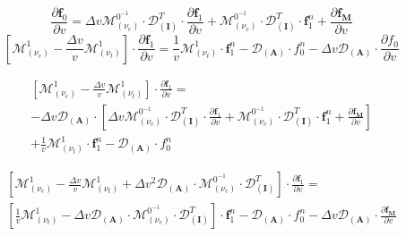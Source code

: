 \documentclass[preprint,12pt]{elsarticle}
\newcommand{\pdv}[2]{\frac{\partial{#1}}{\partial{#2}}}
\newcommand{\vect}[1]{\boldsymbol{#1}}
\newcommand{\matr}[1]{\mathbf{#1}}
\newcommand{\nue}{\nu_{e}}
\newcommand{\nutot}{\nu_{t}}
\newcommand{\vmag}{v}
\newcommand{\fM}{f_M}
\newcommand{\fzero}{f_0}
\newcommand{\vfzero}{\vect{f}_0}
\newcommand{\fone}{\vect{f}_1}
\newcommand{\MI}{\matr{I}}
\newcommand{\MA}{\matr{A}}
\newcommand{\IM}{\boldsymbol{\mathcal{M}}}
\newcommand{\ID}{\boldsymbol{\mathcal{D}}}
\begin{document}
\begin{equation}
  \pdv{\vfzero}{\vmag}  
  = 
  \Delta \vmag \IM^{0^{-1}}_{(\nue)}\cdot\ID^T_{\left(\MI\right)} \cdot 
  \pdv{\fone}{\vmag}
  + \IM^{0^{-1}}_{(\nue)}\cdot\ID^T_{\left(\MI\right)} \cdot \fone^n
  + \pdv{\vect{\fM}}{\vmag}
  \label{eq:implicitdf0dv}
\end{equation}
\begin{equation}
  \left[\IM^1_{(\nue)} 
  - \frac{\Delta \vmag}{\vmag}\IM^1_{\left( \nutot \right)} \right]
  \cdot \pdv{\fone}{\vmag}  
  = 
  \frac{1}{\vmag}\IM^1_{\left( \nutot \right)} 
  \cdot \fone^n
  - \ID_{\left(\MA\right)}\cdot \fzero^n
  - \Delta \vmag \ID_{\left(\MA\right)}\cdot \pdv{\fzero}{\vmag}
  \nonumber
\end{equation}

\begin{multline}
  \left[\IM^1_{(\nue)} 
  - \frac{\Delta \vmag}{\vmag}\IM^1_{\left( \nutot \right)} \right]
  \cdot \pdv{\fone}{\vmag}  
  =\\ 
  - \Delta \vmag \ID_{\left(\MA\right)}\cdot
  \left[ 
  \Delta \vmag \IM^{0^{-1}}_{(\nue)}\cdot\ID^T_{\left(\MI\right)} \cdot 
  \pdv{\fone}{\vmag}
  + \IM^{0^{-1}}_{(\nue)}\cdot\ID^T_{\left(\MI\right)} \cdot \fone^n
  + \pdv{\vect{\fM}}{\vmag}
  \right]\\
  + \frac{1}{\vmag}\IM^1_{\left( \nutot \right)} 
  \cdot \fone^n
  - \ID_{\left(\MA\right)}\cdot \fzero^n 
  \nonumber
\end{multline}


\begin{multline}
  \left[\IM^1_{(\nue)} 
  - \frac{\Delta \vmag}{\vmag}\IM^1_{\left( \nutot \right)} 
  + \Delta \vmag^2 \ID_{\left(\MA\right)}\cdot
  \IM^{0^{-1}}_{(\nue)}\cdot\ID^T_{\left(\MI\right)}
  \right]
  \cdot \pdv{\fone}{\vmag}  
  = \\ 
  \left[ \frac{1}{\vmag}\IM^1_{\left( \nutot \right)}
  - \Delta \vmag \ID_{\left(\MA\right)}\cdot \IM^{0^{-1}}_{(\nue)}\cdot
  \ID^T_{\left(\MI\right)} \right] \cdot \fone^n
  - \ID_{\left(\MA\right)}\cdot \fzero^n 
  - \Delta \vmag \ID_{\left(\MA\right)}\cdot\pdv{\vect{\fM}}{\vmag} 
  \label{eq:implicitdf1dv}
\end{multline}
\end{document}
